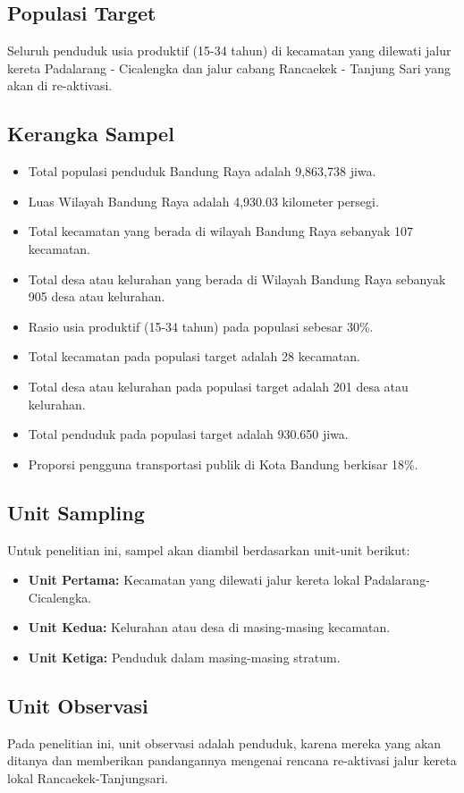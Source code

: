 \documentclass{article}
\begin{document}
\subsection{Populasi Target}
Seluruh penduduk usia produktif (15-34 tahun) di kecamatan yang dilewati jalur kereta Padalarang - Cicalengka dan jalur cabang Rancaekek - Tanjung Sari yang akan di re-aktivasi.
\subsection{Kerangka Sampel}
\begin{itemize}
    \item Total populasi penduduk Bandung Raya adalah 9,863,738 jiwa.
    \item Luas Wilayah Bandung Raya adalah 4,930.03 kilometer persegi.
    \item Total kecamatan yang berada di wilayah Bandung Raya sebanyak 107 kecamatan.
    \item Total desa atau kelurahan yang berada di Wilayah Bandung Raya sebanyak 905 desa atau kelurahan.
    \item Rasio usia produktif (15-34 tahun) pada populasi sebesar 30\%.
    \item Total kecamatan pada populasi target adalah 28 kecamatan.
    \item Total desa atau kelurahan pada populasi target adalah 201 desa atau kelurahan.
    \item Total penduduk pada populasi target adalah 930.650 jiwa.
    \item Proporsi pengguna transportasi publik di Kota Bandung berkisar 18\%.
\end{itemize}

\subsection{Unit Sampling}
Untuk penelitian ini, sampel akan diambil berdasarkan unit-unit berikut:
\begin{itemize}
\item \textbf{Unit Pertama:} Kecamatan yang dilewati jalur kereta lokal Padalarang-Cicalengka.
\item \textbf{Unit Kedua:} Kelurahan atau desa di masing-masing kecamatan.
\item \textbf{Unit Ketiga:} Penduduk dalam masing-masing stratum.
\end{itemize}

\subsection{Unit Observasi}
Pada penelitian ini, unit observasi adalah penduduk, karena mereka yang akan ditanya dan memberikan pandangannya mengenai rencana re-aktivasi jalur kereta lokal Rancaekek-Tanjungsari.
\end{document}
